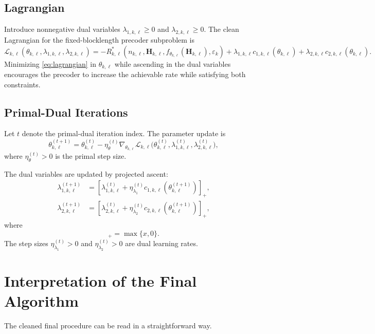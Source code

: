 \documentclass[11pt]{article}
\newcommand{\Hc}{\mathbf{H}}
\begin{document}
\subsection{Lagrangian}
Introduce nonnegative dual variables $\lambda_{1,k,\ell} \ge 0$ and $\lambda_{2,k,\ell} \ge 0$. The clean Lagrangian for the fixed-blocklength precoder subproblem is
\begin{equation}
\mathcal{L}_{k,\ell}(\theta_{k,\ell},\lambda_{1,k,\ell},\lambda_{2,k,\ell})
=
-R_{k,\ell}^*(n_{k,\ell},\Hc_{k,\ell},f_{\theta_{k,\ell}}(\Hc_{k,\ell}),\varepsilon_k)
+ \lambda_{1,k,\ell} c_{1,k,\ell}(\theta_{k,\ell})
+ \lambda_{2,k,\ell} c_{2,k,\ell}(\theta_{k,\ell}).
\label{eq:lagrangian}
\end{equation}
Minimizing \eqref{eq:lagrangian} in $\theta_{k,\ell}$ while ascending in the dual variables encourages the precoder to increase the achievable rate while satisfying both constraints.

\subsection{Primal-Dual Iterations}
Let $t$ denote the primal-dual iteration index. The parameter update is
\begin{equation}
\theta_{k,\ell}^{(t+1)}
=
\theta_{k,\ell}^{(t)}
-
\eta_\theta^{(t)}
\nabla_{\theta_{k,\ell}}
\mathcal{L}_{k,\ell}
\bigl(
\theta_{k,\ell}^{(t)},
\lambda_{1,k,\ell}^{(t)},
\lambda_{2,k,\ell}^{(t)}
\bigr),
\label{eq:theta-update}
\end{equation}
where $\eta_\theta^{(t)} > 0$ is the primal step size.

The dual variables are updated by projected ascent:
\begin{align}
\lambda_{1,k,\ell}^{(t+1)}
&=
\left[
\lambda_{1,k,\ell}^{(t)}
+
\eta_{\lambda_1}^{(t)} c_{1,k,\ell}\!\left(\theta_{k,\ell}^{(t+1)}\right)
\right]_+,
\label{eq:lambda1-update}
\\
\lambda_{2,k,\ell}^{(t+1)}
&=
\left[
\lambda_{2,k,\ell}^{(t)}
+
\eta_{\lambda_2}^{(t)} c_{2,k,\ell}\!\left(\theta_{k,\ell}^{(t+1)}\right)
\right]_+,
\label{eq:lambda2-update}
\end{align}
where
\begin{equation}
[x]_+ = \max\{x,0\}.
\label{eq:projection}
\end{equation}
The step sizes $\eta_{\lambda_1}^{(t)} > 0$ and $\eta_{\lambda_2}^{(t)} > 0$ are dual learning rates.

\section{Interpretation of the Final Algorithm}
The cleaned final procedure can be read in a straightforward way.
\end{document}
